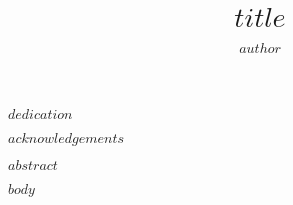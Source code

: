 \documentclass[letterpaper,oneside,11pt]{book}
\title{$title$}
\author{\textsc{$author$}}
\begin{document}
	\copyrightfalse
	
	\beforepreface
	
	\clearpage
	\thispagestyle{empty}
	\begin{dedication}
 		\begin{center}
 			\begin{minipage}[c]{3in}
 				\emph{%
 					$dedication$
 				}
 			\end{minipage}
 		\end{center}
	\end{dedication}
	
		$acknowledgements$
	
 		$abstract$
	
	\afterpreface

	$body$
	
\end{document}
